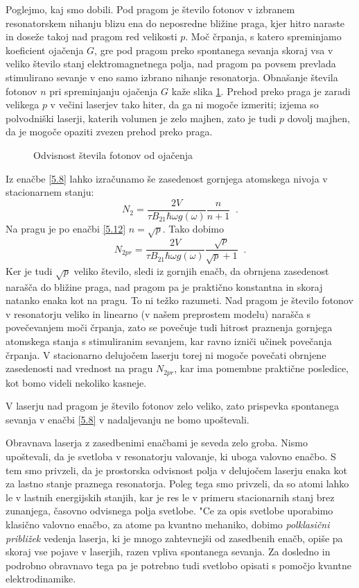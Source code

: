 Poglejmo, kaj smo dobili. Pod pragom je število fotonov v izbranem
resonatorskem nihanju blizu ena do neposredne bližine praga, kjer hitro
naraste in doseže takoj nad pragom red velikosti $p$. Moč črpanja, s
katero spreminjamo koeficient ojačenja $G$, gre pod pragom preko spontanega
sevanja skoraj vsa v veliko število stanj elektromagnetnega polja, nad
pragom pa povsem prevlada stimulirano sevanje v eno samo izbrano nihanje
resonatorja. Obnašanje števila fotonov $n$ pri spremi\-njanju ojačenja $G$
kaže slika \ref{s5.3}. Prehod preko praga je zaradi velikega $p$ v večini
laserjev tako hiter, da ga ni mogoče izmeriti; izjema so polvodniški
laserji, katerih volumen je zelo majhen, zato je tudi $p$ dovolj majhen, da
je mogoče opaziti zvezen prehod preko praga.

\begin{figure}[tbp]
\label{s5.3} \vskip 5cm
\caption{Odvisnost števila fotonov od ojačenja}
\end{figure}

Iz enačbe \ref{5.8} lahko izračunamo še zasedenost gornjega atomskega
nivoja v stacionarnem stanju: 
\begin{equation}  \label{5.15}
N_2=\frac{2V}{\tau B_{21}\hbar\omega g(\omega)}\frac{n}{n+1}\;\;.
\end{equation}
Na pragu je po enačbi \ref{5.12} $n=\sqrt{p}$. Tako dobimo 
\begin{equation}  \label{5.16}
N_{2pr}=\frac{2V}{\tau B_{21}\hbar\omega g(\omega)}\frac{\sqrt{p}}{\sqrt{p}+1%
}\;\;.
\end{equation}
Ker je tudi $\sqrt{p}$ veliko število, sledi iz gornjih enačb, da obrnjena
zasedenost narašča do bližine praga, nad pragom pa je praktično
konstantna in skoraj natanko enaka kot na pragu. To ni težko razumeti. Nad
pragom je število fotonov v resonatorju veliko in linearno (v našem
preprostem modelu) narašča s povečevanjem moči črpanja, zato se
povečuje tudi hitrost praznenja gornjega atomskega stanja s stimuliranim
sevanjem, kar ravno izniči učinek povečanja črpanja. V stacionarno
delujočem laserju torej ni mogoče povečati obrnjene zasedenosti nad
vrednost na pragu $N_{2pr}$, kar ima pomembne praktične posledice, kot bomo
videli nekoliko kasneje.

V laserju nad pragom je število fotonov zelo veliko, zato prispevka
spontanega sevanja v enačbi \ref{5.8} v nadaljevanju ne bomo upoštevali.

Obravnava laserja z zasedbenimi enačbami je seveda zelo groba. Nismo
upoštevali, da je svetloba v resonatorju valovanje, ki uboga valo\-vno
enačbo. S tem smo privzeli, da je prostorska odvisnost polja v delujočem
laserju enaka kot za lastno stanje praznega resonatorja. Poleg tega smo
privzeli, da so atomi lahko le v lastnih energijskih stanjih, kar je res le
v primeru stacionarnih stanj brez zunanjega, časovno odvisnega polja
svetlobe. "Ce za opis svetlobe uporabimo klasično valovno enačbo, za atome
pa kvantno mehaniko, dobimo {\it polklasični približek} vedenja laserja,
ki je mnogo zahtevnejši od zasedbenih enačb, opiše pa skoraj vse pojave v
laserjih, razen vpliva spontanega sevanja. Za dosledno in podrobno obravnavo
tega pa je potrebno tudi svetlobo opisati s pomočjo kvantne elektrodinamike.

